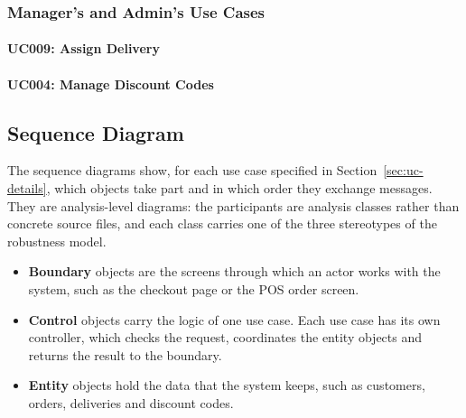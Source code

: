 \clearpage
\subsubsection{Manager's and Admin's Use Cases}

\paragraph{UC009: Assign Delivery}

\clearpage
\paragraph{UC004: Manage Discount Codes}

\clearpage
\subsection{Sequence Diagram}\label{sec:sequence}

The sequence diagrams show, for each use case specified in Section~\ref{sec:uc-details}, which objects take part and in which order they exchange messages. They are analysis-level diagrams: the participants are analysis classes rather than concrete source files, and each class carries one of the three stereotypes of the robustness model.

\begin{itemize}
  \item \textbf{Boundary} objects are the screens through which an actor works with the system, such as the checkout page or the POS order screen.
  \item \textbf{Control} objects carry the logic of one use case. Each use case has its own controller, which checks the request, coordinates the entity objects and returns the result to the boundary.
  \item \textbf{Entity} objects hold the data that the system keeps, such as customers, orders, deliveries and discount codes.
\end{itemize}

